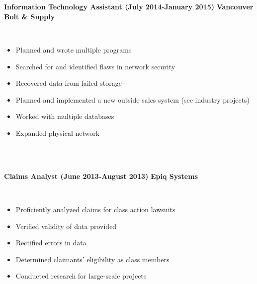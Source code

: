 \documentclass{article}
\begin{document}
\phantom \\
\phantom \\
%
%
%
%
\begin{vwcol}[widths={0.8,0.2}, sep=.8cm, justify=flush, rule=0pt, indent=0em]
\noindent \textbf{Information Technology Assistant (July 2014-January 2015)}
\newpage
\noindent \textbf{Vancouver Bolt \& Supply}
\end{vwcol}
\phantom \\
\begin{itemize}
\item Planned and wrote multiple programs
\item Searched for and identified flaws in network security
\item Recovered data from failed storage
\item Planned and implemented a new outside sales system (see industry projects)
\item Worked with multiple databases
\item Expanded physical network
\end{itemize}
\phantom \\
\phantom \\
%
%
%
%
\begin{vwcol}[widths={0.8,0.2}, sep=.8cm, justify=flush, rule=0pt, indent=0em]
\noindent \textbf{Claims Analyst (June 2013-August 2013)}
\newpage
\noindent \textbf{Epiq Systems}
\end{vwcol}
\phantom \\
\begin{itemize}
\item Proficiently analyzed claims for class action lawsuits
\item Verified validity of data provided
\item Rectified errors in data
\item Determined claimants' eligibility as class members
\item Conducted research for large-scale projects
\end{itemize}
\phantom \\
\phantom \\
%
%
%
%
\par
\phantom \\
\phantom \\
\end{document}
